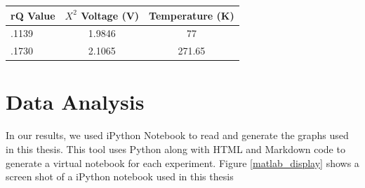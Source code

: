 \begin{table}[h!tb] \centering
{}
\label{rad_performance}
\begin{tabular}{lcc} \hline
\textbf{rQ Value} & \textbf{$X^2$ Voltage (V)} & \textbf{Temperature (K)} \\ \hline
.1139 & 1.9846 & 77 \\
.1730 & 2.1065 & 271.65 \\ \hline
\end{tabular}
\end{table}


\section{Data Analysis}\label{Exp1_analysis}

In our results, we used iPython Notebook to read and generate the graphs used in this thesis.  This tool uses Python along with HTML and Markdown code to generate a virtual notebook for each experiment.  Figure \ref{matlab_display} shows a screen shot of a iPython notebook used in this thesis

